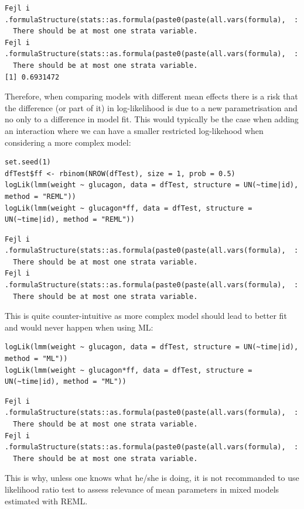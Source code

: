 \documentclass[12pt]{article}
\begin{document}
\begin{verbatim}
Fejl i .formulaStructure(stats::as.formula(paste0(paste(all.vars(formula),  : 
  There should be at most one strata variable.
Fejl i .formulaStructure(stats::as.formula(paste0(paste(all.vars(formula),  : 
  There should be at most one strata variable.
[1] 0.6931472
\end{verbatim}


Therefore, when comparing models with different mean effects there is
a risk that the difference (or part of it) in log-likelihood is due to
a new parametrisation and no only to a difference in model fit. This
would typically be the case when adding an interaction where we can
have a smaller restricted log-likehood when considering a more complex
model:

\lstset{language=r,label= ,caption= ,captionpos=b,numbers=none}
\begin{lstlisting}
set.seed(1)
dfTest$ff <- rbinom(NROW(dfTest), size = 1, prob = 0.5)
logLik(lmm(weight ~ glucagon, data = dfTest, structure = UN(~time|id), method = "REML"))
logLik(lmm(weight ~ glucagon*ff, data = dfTest, structure = UN(~time|id), method = "REML"))
\end{lstlisting}

\begin{verbatim}
Fejl i .formulaStructure(stats::as.formula(paste0(paste(all.vars(formula),  : 
  There should be at most one strata variable.
Fejl i .formulaStructure(stats::as.formula(paste0(paste(all.vars(formula),  : 
  There should be at most one strata variable.
\end{verbatim}


This is quite counter-intuitive as more complex model should lead to
better fit and would never happen when using ML:
\lstset{language=r,label= ,caption= ,captionpos=b,numbers=none}
\begin{lstlisting}
logLik(lmm(weight ~ glucagon, data = dfTest, structure = UN(~time|id), method = "ML"))
logLik(lmm(weight ~ glucagon*ff, data = dfTest, structure = UN(~time|id), method = "ML"))
\end{lstlisting}

\begin{verbatim}
Fejl i .formulaStructure(stats::as.formula(paste0(paste(all.vars(formula),  : 
  There should be at most one strata variable.
Fejl i .formulaStructure(stats::as.formula(paste0(paste(all.vars(formula),  : 
  There should be at most one strata variable.
\end{verbatim}


This is why, unless one knows what he/she is doing, it is not
recommanded to use likelihood ratio test to assess relevance of mean
parameters in mixed models estimated with REML.
\end{document}
